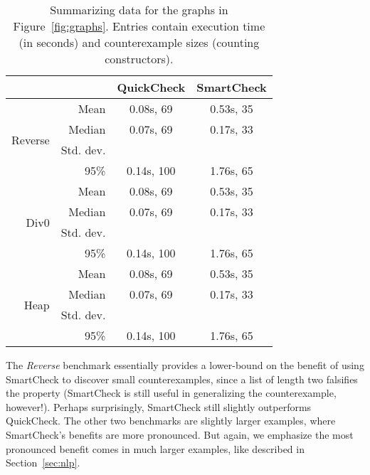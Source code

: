 \documentclass{sigplanconf}
\begin{document}
\begin{table}[ht]
\footnotesize
  \begin{center}
    \begin{tabular}{|r|r||c|c|}
\hline
\multicolumn{2}{|c||}{} & QuickCheck & SmartCheck \\
\hline \hline

\multirow{4}{*}{Reverse}
  & Mean       & 0.08s, 69  & 0.53s, 35  \\
  \cline{2-4}
  & Median     & 0.07s, 69  & 0.17s, 33  \\
  \cline{2-4}
  & Std. dev.  &            &            \\
  \cline{2-4}
  & 95\%       & 0.14s, 100 & 1.76s, 65  \\
  \hline

\multirow{4}{*}{Div0}
  & Mean       & 0.08s, 69  & 0.53s, 35  \\
  \cline{2-4}
  & Median     & 0.07s, 69  & 0.17s, 33  \\
  \cline{2-4}
  & Std. dev.  &            &            \\
  \cline{2-4}
  & 95\%       & 0.14s, 100 & 1.76s, 65  \\
  \hline

\multirow{4}{*}{Heap}
  & Mean       & 0.08s, 69  & 0.53s, 35  \\
  \cline{2-4}
  & Median     & 0.07s, 69  & 0.17s, 33  \\
  \cline{2-4}
  & Std. dev.  &            &            \\
  \cline{2-4}
  & 95\%       & 0.14s, 100 & 1.76s, 65  \\
  \hline
    \end{tabular}

  \end{center}
  \caption{Summarizing data for the graphs in Figure~\ref{fig:graphs}. Entries
    contain execution time (in seconds) and counterexample sizes (counting
    constructors).}
  \label{table:results}
\end{table}

The \emph{Reverse} benchmark essentially provides a lower-bound on the benefit
of using SmartCheck to discover small counterexamples, since a list of length
two falsifies the property (SmartCheck is still useful in generalizing the
counterexample, however!).  Perhaps surprisingly, SmartCheck still slightly
outperforms QuickCheck.  The other two benchmarks are slightly larger examples,
where SmartCheck's benefits are more pronounced.  But again, we emphasize the
most pronounced benefit comes in much larger examples, like described in
Section~\ref{sec:nlp}.
\end{document}
